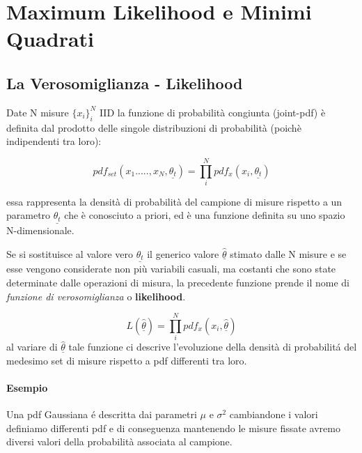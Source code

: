 
\setcounter{chapter}{4}
\chapter{Maximum Likelihood e Minimi Quadrati}

\section{La Verosomiglianza - Likelihood}

Date N misure  $\{x_{i}\}_{i}^N$ IID la funzione di probabilit\`{a} congiunta (joint-pdf) \`{e} definita dal prodotto delle singole distribuzioni di probabilit\`{a} (poich\`{e} indipendenti tra loro):

\begin{equation*}
		pdf_{set}(x_1.....,x_N,\underline{\theta_t}) = \prod_{i}^N pdf_{x}(x_i,\underline{\theta_{t}})	
\end{equation*}

\noindent essa rappresenta la densit\`{a} di probabilit\`{a} del campione di misure rispetto a un parametro $\underline{\theta_t}$ che \`{e} conosciuto a priori, ed \`{e} una funzione definita su uno spazio N-dimensionale.\newline

\noindent Se si sostituisce al valore vero $\underline{\theta_{t}}$ il generico valore $\underline{\hat{\theta}}$ stimato dalle N misure e se esse vengono considerate non pi\`{u} variabili casuali, ma costanti che sono state determinate dalle operazioni di misura, la precedente funzione prende il nome di \textit{funzione di verosomiglianza} o \textbf{likelihood}.

\begin{equation*}
		 L(\underline{\hat{\theta}}) = \prod_{i}^N pdf_{x}(x_i,\underline{\hat{\theta}}) 
\end{equation*}
al variare di $\underline{\hat{\theta}}$ tale funzione ci descrive l'evoluzione della densit\`{a} di probabilit\'{a} del medesimo set di misure rispetto a pdf differenti tra loro.

\subsubsection{Esempio}

Una pdf Gaussiana \'{e} descritta dai parametri $\mu$ e $\sigma^2$ cambiandone i valori definiamo differenti pdf e di conseguenza mantenendo le misure fissate avremo diversi valori della probabilit\`{a} associata al campione.

